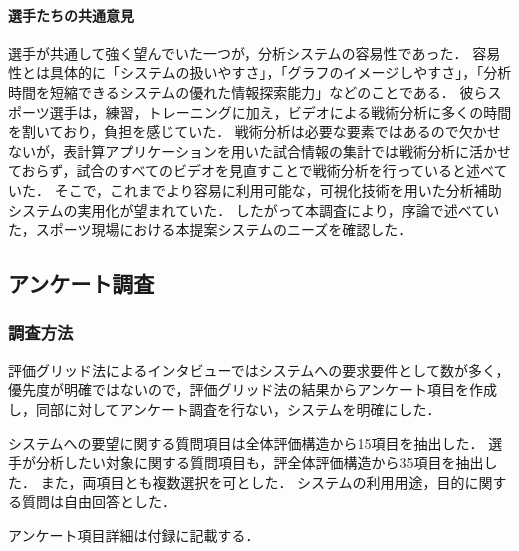 \documentclass[sotsuron]{kuee}
\begin{document}
				\paragraph{選手たちの共通意見}
					選手が共通して強く望んでいた一つが，分析システムの容易性であった．
					容易性とは具体的に「システムの扱いやすさ」，「グラフのイメージしやすさ」，「分析時間を短縮できるシステムの優れた情報探索能力」などのことである．
					彼らスポーツ選手は，練習，トレーニングに加え，ビデオによる戦術分析に多くの時間を割いており，負担を感じていた．
					戦術分析は必要な要素ではあるので欠かせないが，表計算アプリケーションを用いた試合情報の集計では戦術分析に活かせておらず，試合のすべてのビデオを見直すことで戦術分析を行っていると述べていた．
					そこで，これまでより容易に利用可能な，可視化技術を用いた分析補助システムの実用化が望まれていた．
					したがって本調査により，序論で述べていた，スポーツ現場における本提案システムのニーズを確認した．
		\subsection{アンケート調査}
			\subsubsection{調査方法}
				評価グリッド法によるインタビューではシステムへの要求要件として数が多く，優先度が明確ではないので，評価グリッド法の結果からアンケート項目を作成し，同部に対してアンケート調査を行ない，システムを明確にした．
				
				システムへの要望に関する質問項目は全体評価構造から15項目を抽出した．
				選手が分析したい対象に関する質問項目も，評全体評価構造から35項目を抽出した．
				また，両項目とも複数選択を可とした．
				システムの利用用途，目的に関する質問は自由回答とした．
				
				アンケート項目詳細は付録に記載する．
\end{document}
